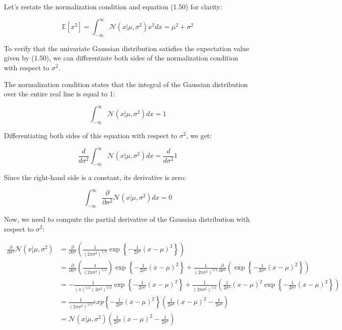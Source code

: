 \documentclass{article}
\begin{document}
\begin{tcolorbox}[breakable,colback=gray!5,colframe=gray!60,title=Solution]
Let's restate the normalization condition and equation (1.50) for clarity:

\[
\mathbb{E}[x^2] = \int_{-\infty}^{\infty} \mathcal{N}(x|\mu,\sigma^2) x^2 dx = \mu^2 + \sigma^2 \tag{1.50}
\]

To verify that the univariate Gaussian distribution satisfies the expectation value given by (1.50), we can differentiate both sides of the normalization condition with respect to \( \sigma^2 \).

The normalization condition states that the integral of the Gaussian distribution over the entire real line is equal to 1:

\[
\int_{-\infty}^{\infty} \mathcal{N}(x|\mu,\sigma^2) dx = 1
\]

Differentiating both sides of this equation with respect to \( \sigma^2 \), we get:

\[
\frac{d}{d\sigma^2} \int_{-\infty}^{\infty} \mathcal{N}(x|\mu,\sigma^2) dx = \frac{d}{d\sigma^2} 1
\]

Since the right-hand side is a constant, its derivative is zero:

\[
\int_{-\infty}^{\infty} \frac{\partial}{\partial \sigma^2} \mathcal{N}(x|\mu,\sigma^2) dx = 0
\]

Now, we need to compute the partial derivative of the Gaussian distribution with respect to \( \sigma^2 \):

\begin{align*}
\frac{\partial}{\partial \sigma^2} \mathcal{N}(x|\mu,\sigma^2) &= \frac{\partial}{\partial \sigma^2} \left( \frac{1}{\left(2\pi\sigma^2\right)^{1/2}} \exp\left\{-\frac{1}{2\sigma^2}(x-\mu)^2\right\} \right) \\
&= \frac{\partial}{\partial \sigma^2} \left( \frac{1}{\left(2\pi\sigma^2\right)^{1/2}} \right) \exp\left\{-\frac{1}{2\sigma^2}(x-\mu)^2\right\} + \frac{1}{\left(2\pi\sigma^2\right)^{1/2}} \frac{\partial}{\partial \sigma^2} \left( \exp\left\{-\frac{1}{2\sigma^2}(x-\mu)^2\right\} \right) \\
&= -\frac{1}{\left(\pi\right)^{1/2} \left(2\sigma^2\right)^{3/2}} \exp\left\{-\frac{1}{2\sigma^2}(x-\mu)^2\right\} + \frac{1}{\left(2\pi\sigma^2\right)^{1/2}} \left( \frac{1}{2\sigma^4} (x-\mu)^2 \exp\left\{-\frac{1}{2\sigma^2}(x-\mu)^2\right\} \right) \\
&= \frac{1}{\left(2\pi\sigma^2\right)^{1/2}}exp\left\{-\frac{1}{2\sigma^2}(x-\mu)^2\right\} \left( \frac{1}{2\sigma^4} (x-\mu)^2 - \frac{1}{2\sigma^2} \right) \\
&= \mathcal{N}(x|\mu,\sigma^2) \left(\frac{1}{2\sigma^4} (x-\mu)^2 - \frac{1}{2\sigma^2}\right)
\end{align*}


\end{tcolorbox}
\end{document}
